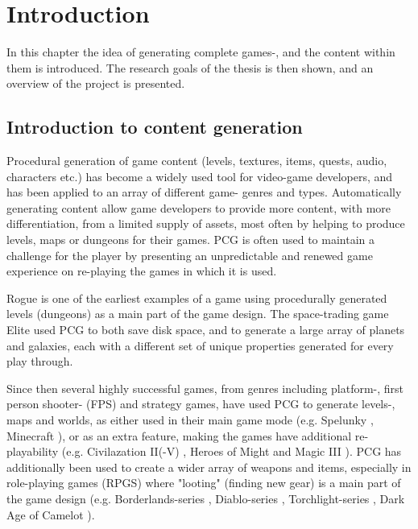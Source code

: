 \documentclass[a4paper,titlepage,final]{report}
\begin{document}
\tableofcontents
\newpage


\chapter{Introduction}
In this chapter the idea of generating complete games-, and the content within them is introduced.
The research goals of the thesis is then shown, and an overview of the project is presented.

\section{Introduction to content generation}
\label{sec_introtocontentgen}

Procedural generation of game content (levels, textures, items, quests, audio, characters etc.) has become a widely used tool for video-game developers, and has been applied to an array of different game- genres and types.
Automatically generating content allow game developers to provide more content, with more differentiation, from a limited supply of assets, most often by helping to produce levels, maps or dungeons for their games. 
PCG is often used to maintain a challenge for the player by presenting an unpredictable and renewed game experience on re-playing the games in which it is used.

Rogue \citep{game:rogue} is one of the earliest examples of a game using procedurally generated levels (dungeons) as a main part of the game design.
The space-trading game Elite \citep{game:elite} used PCG to both save disk space, and to generate a large array of planets and galaxies, each with a different set of unique properties generated for every play through. 

Since then several highly successful games, from genres including platform-, first person shooter- (FPS) and strategy games, have used PCG to generate levels-, maps and worlds, as either used in their main game mode (e.g. Spelunky \citep{game:spelunky}, Minecraft \citep{game:minecraft}), or as an extra feature, making the games have additional re-playability (e.g. Civilazation II(-V) \citep{game:civilizationii}, Heroes of Might and Magic III \citep{game:homm3}).
PCG has additionally been used to create a wider array of weapons and items, especially in role-playing games (RPGS) where "looting" (finding new gear) is a main part of the game design (e.g. Borderlands-series \citep{game:borderlandsseries}, Diablo-series \citep{game:diabloseries}, Torchlight-series \citep{game:diabloseries}, Dark Age of Camelot \citep{game:darkage}).
\end{document}
